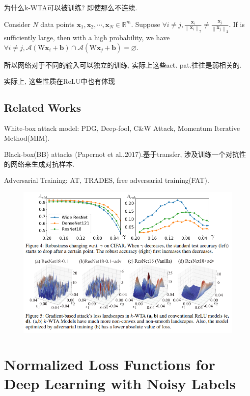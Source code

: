 \documentclass{article}
\begin{document}
为什么k-WTA可以被训练? 即使那么不连续.

\begin{theorem}
    Consider $N$ data points $\boldsymbol{x}_{1}, \boldsymbol{x}_{2}, \cdots, \boldsymbol{x}_{N} \in \mathbb{R}^{m}$. Suppose $\forall i \neq j, \frac{\boldsymbol{x}_{i}}{\left\|\boldsymbol{x}_{i}\right\|_{2}} \neq \frac{\boldsymbol{x}_{j}}{\left\|\boldsymbol{x}_{j}\right\|_{2}} .$ If
    is sufficiently large, then with a high probability, we have $\forall i \neq j, \mathcal{A}\left(\mathrm{W} \boldsymbol{x}_{i}+\boldsymbol{b}\right) \cap \mathcal{A}\left(\mathrm{W} \boldsymbol{x}_{j}+\boldsymbol{b}\right)=\varnothing$.
\end{theorem}
所以网络对于不同的输入可以独立的训练, 实际上这些act. pat.往往是弱相关的.

实际上, 这些性质在ReLU中也有体现

\subsection{Related Works}

White-box attack model: PDG, Deep-fool, C\&W Attack, Momentum Iterative Method(MIM).

Black-box(BB) attacks (Papernot et al.,2017).基于transfer, 涉及训练一个对抗性的网络来生成对抗样本.

Adversarial Training: AT, TRADES, free adversarial training(FAT).
\begin{figure}[htbp]
    \centering
    \includegraphics[width=\textwidth]{kwta-facts.png}
\end{figure}

\section{Normalized Loss Functions for Deep Learning with Noisy Labels}
\end{document}
